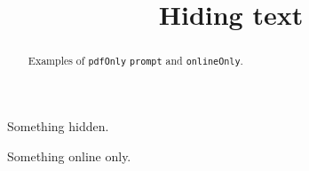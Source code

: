 


\title[Examples:]{Hiding text}


\begin{abstract}
  Examples of \texttt{pdfOnly} \texttt{prompt} and
  \texttt{onlineOnly}.
\end{abstract}
\maketitle


\begin{prompt}  
  Something hidden.
\end{prompt}
\begin{onlineOnly}
  Something online only.
\end{onlineOnly}


